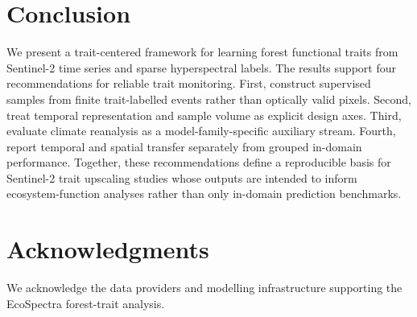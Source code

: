 \documentclass[final,times,onecolumn, authoryear]{elsarticle}
\begin{document}
\begin{linenumbers}
\section{Conclusion}

We present a trait-centered framework for learning forest functional traits from Sentinel-2 time series and sparse hyperspectral labels. The results support four recommendations for reliable trait monitoring. First, construct supervised samples from finite trait-labelled events rather than optically valid pixels. Second, treat temporal representation and sample volume as explicit design axes. Third, evaluate climate reanalysis as a model-family-specific auxiliary stream. Fourth, report temporal and spatial transfer separately from grouped in-domain performance. Together, these recommendations define a reproducible basis for Sentinel-2 trait upscaling studies whose outputs are intended to inform ecosystem-function analyses rather than only in-domain prediction benchmarks.

\section*{Acknowledgments}

We acknowledge the data providers and modelling infrastructure supporting the EcoSpectra forest-trait analysis.




\end{linenumbers}
\end{document}
